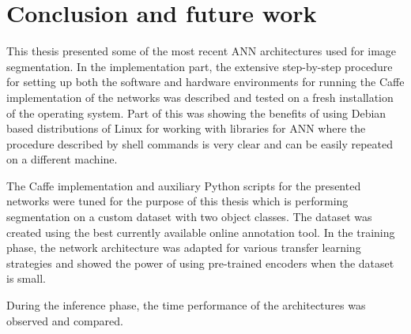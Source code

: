 \clearpage
\chapter{Conclusion and future work}

This thesis presented some of the most recent ANN architectures used for image segmentation. In the implementation part, the extensive step-by-step procedure for setting up both the software and hardware environments for running the Caffe implementation of the networks was described and tested on a fresh installation of the operating system. Part of this was showing the benefits of using Debian based distributions of Linux for working with libraries for ANN where the procedure described by shell commands is very clear and can be easily repeated on a different machine.

The Caffe implementation and auxiliary Python scripts for the presented networks were tuned for the purpose of this thesis which is performing segmentation on a custom dataset with two object classes. The dataset was created using the best currently available online annotation tool. In the training phase, the network architecture was adapted for various transfer learning strategies and showed the power of using pre-trained encoders when the dataset is small. 

During the inference phase, the time performance of the architectures was observed and compared.  
